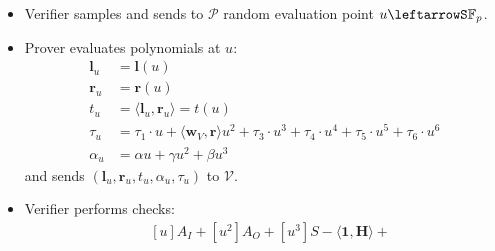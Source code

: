 \documentclass[../lecture-notes-148x210.tex]{subfiles}
\begin{document}
\begin{definition}
\begin{itemize}
        \begin{equation*}
            \begin{aligned}
                T_1 &= [t_1]G + [\tau_1]B\\
                T_3 &= [t_3]G + [\tau_3]B\\
                T_4 &= [t_4]G + [\tau_4]B\\
                T_5 &= [t_5]G + [\tau_5]B\\
                T_6 &= [t_6]G + [\tau_6]B
            \end{aligned}
        \end{equation*}
        \textbf{Note:} Prover does not send separate commitment to $t_2$ as the verifier could derive it from $\mathbf{V}$ and the circuit public parameters: 
        \begin{align*}
            t_2 &= w_c + \langle \mathbf{w}_V, \mathbf{v} \rangle + \delta(y, z) \\
            T_2 &= \langle \mathbf{w}_V, \mathbf{V} \rangle + [\delta(y, z) + w_c]G
        \end{align*}
        \item Verifier samples and sends to $\mathcal{P}$ random evaluation point $u \leftarrowS \mathbb{F}_p$.
        \item Prover evaluates polynomials at $u$:
            \begin{equation*}
                \begin{aligned}
                    \mathbf{l}_u &= \mathbf{l}(u) \\
                    \mathbf{r}_u &= \mathbf{r}(u) \\
                    t_u &= \langle \mathbf{l}_u, \mathbf{r}_u \rangle = t(u) \\
                    \tau_u &= \tau_1 \cdot u + \langle \mathbf{w}_V, \mathbf{r} \rangle u^2 + \tau_3 \cdot u^3 + \tau_4 \cdot u^4 + \tau_5 \cdot u^5 + \tau_6 \cdot u^6\\
                    \alpha_u &= \alpha u + \gamma u^2 + \beta u^3
                \end{aligned}
            \end{equation*}
            and sends $(\mathbf{l}_u, \mathbf{r}_u, t_u, \alpha_u, \tau_u)$ to $\mathcal{V}$.
        \item Verifier performs checks:
            \begin{equation*}
                \begin{aligned}
                    &[u]A_I + [u^2]A_O + [u^3]S - \langle \mathbf{1}, \mathbf{H} \rangle + \\

\end{aligned}
\end{equation*}
\end{itemize}
\end{definition}
\end{document}
